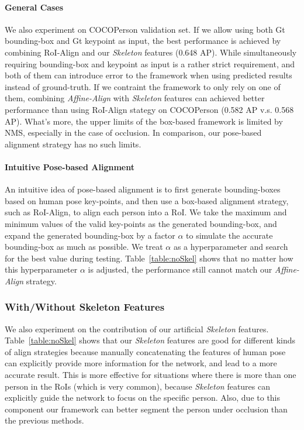 \documentclass[10pt,twocolumn,letterpaper]{article}
\begin{document}
\paragraph{General Cases} We also experiment on COCOPerson validation set. If we allow using both Gt bounding-box and Gt keypoint as input, the best performance is achieved by combining RoI-Align and our \emph{Skeleton} features (0.648 AP).  While simultaneously requiring bounding-box and keypoint as input is a rather strict requirement, and both of them can introduce error to the framework when using predicted results instead of ground-truth. If we contraint the framework to only rely on one of them, combining \emph{Affine-Align} with \emph{Skeleton} features can achieved better performance than using RoI-Align stategy on COCOPerson (0.582 AP v.s. 0.568 AP). What's more, the upper limits of the box-based framework is limited by NMS, especially in the case of occlusion. In comparison, our pose-based alignment strategy has no such limits.
\vspace{-0.3cm}
\paragraph{Intuitive Pose-based Alignment}  An intuitive idea of pose-based alignment is to first generate bounding-boxes based on human pose key-points, and then use a box-based alignment strategy, such as RoI-Align, to align each person into a RoI. We take the maximum and minimum values of the valid key-points as the generated bounding-box, and expand the generated bounding-box by a factor $\alpha$ to simulate the accurate bounding-box as much as possible. We treat $\alpha$ as a hyperparameter and search for the best value during testing. Table~\ref{table:noSkel} shows that no matter how this hyperparameter $\alpha$ is adjusted, the performance still cannot match our \emph{Affine-Align} strategy.


\subsubsection{With/Without Skeleton Features}

We also experiment on the contribution of our artificial \emph{Skeleton} features. Table~\ref{table:noSkel} shows that our \emph{Skeleton} features are good for different kinds of align strategies because manually concatenating the features of human pose can explicitly provide more information for the network, and lead to a more accurate result. This is more effective for situations where there is more than one person in the RoIs (which is very common), because \emph{Skeleton} features can explicitly guide the network to focus on the specific person. Also, due to this component our framework can better segment the person under occlusion than the previous methods.
\end{document}
